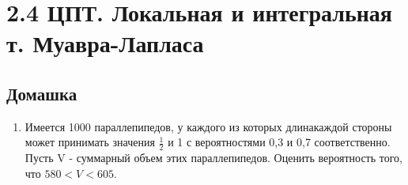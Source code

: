 \documentclass[a4paper, 14pt]{extarticle}
\begin{document}
\section*{2.4 ЦПТ. Локальная и интегральная т. Муавра-Лапласа}
\subsection*{Домашка}
\begin{enumerate}
\item Имеется 1000 параллепипедов, у каждого из которых длинакаждой стороны может принимать значения
$\frac{1}{2}$ и 1 с вероятностями 0,3 и 0,7 соответственно. Пусть V - суммарный объем этих параллепипедов. 
Оценить вероятность того, что $580< V <605$.

\end{enumerate}
\end{document}
